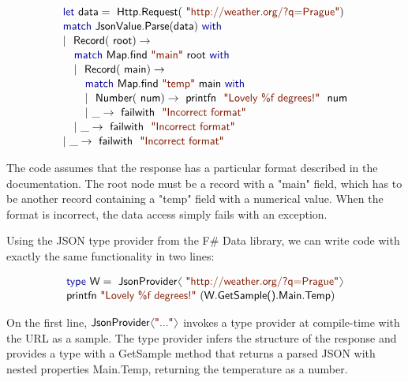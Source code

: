 \documentclass[preprint]{sigplanconf}
\newcommand{\langl}{\begin{picture}(4.5,7)
\put(1.1,2.5){\rotatebox{60}{\line(1,0){5.5}}}
\put(1.1,2.5){\rotatebox{300}{\line(1,0){5.5}}}
\end{picture}}
\newcommand{\rangl}{\begin{picture}(4.5,7)
\put(.9,2.5){\rotatebox{120}{\line(1,0){5.5}}}
\put(.9,2.5){\rotatebox{240}{\line(1,0){5.5}}}
\end{picture}}
\newcommand{\kvd}[1]{\textnormal{\textcolor{kvdclr}{\sffamily #1}}}
\newcommand{\str}[1]{\textnormal{\textcolor{strclr}{\sffamily "#1"}}}
\newcommand{\ident}[1]{\textnormal{\sffamily #1}}
\begin{document}
\noindent
\begin{equation*}
\begin{array}{l}
 \kvd{let}~\ident{data}=\ident{Http.Request}(\str{http://weather.org/?q=Prague}) \\[0.1em]
 \kvd{match}~\ident{JsonValue.Parse}(\ident{data})~\kvd{with} \\[0.1em]
 |~\ident{Record}(\ident{root})\rightarrow \\[0.1em]
 \quad \kvd{match}~\ident{Map.find}~\str{main}~\ident{root}~\kvd{with} \\[0.1em]
 \quad |~\ident{Record}(\ident{main})\rightarrow \\[0.1em]
 \quad \quad \kvd{match}~\ident{Map.find}~\str{temp}~\ident{main}~\kvd{with} \\[0.1em]
 \quad \quad |~\ident{Number}(\ident{num})\rightarrow \ident{printfn}~\str{Lovely \%f degrees!}~\ident{num} \\[0.1em]
 \quad \quad |~\_\rightarrow \ident{failwith}~\str{Incorrect format} \\[0.1em]
 \quad |~\_\rightarrow \ident{failwith}~\str{Incorrect format} \\[0.1em]
 |~\_\rightarrow \ident{failwith}~\str{Incorrect format} 
\end{array}
\end{equation*}
\vspace{0.1em}

\noindent
The code assumes that the response has a particular format described in the documentation. The
root node must be a record with a \str{main} field, which has to be another record containing
a \str{temp} field with a numerical value. When the format is incorrect, the data access simply fails
with an exception.

Using the JSON type provider from the F\# Data library, we can write code with exactly the 
same functionality in two lines:

\vspace{-0.6em}
\begin{equation*}
\begin{array}{l}
 \kvd{type}~\ident{W} = \ident{JsonProvider}\langl\str{http://weather.org/?q=Prague}\rangl \\[0.1em]
 \ident{printfn}~\str{Lovely \%f degrees!}~(\ident{W.GetSample().Main.Temp})
\end{array}
\end{equation*}
\vspace{0.0em}

\noindent
On the first line, $\ident{JsonProvider}\langl\str{...}\rangl$ invokes a type provider at 
compile-time with the URL as a sample. The type provider infers the structure of the response
and provides a type with a \ident{GetSample} method that returns a parsed JSON with nested
properties \ident{Main.Temp}, returning the temperature as a number.
\end{document}
